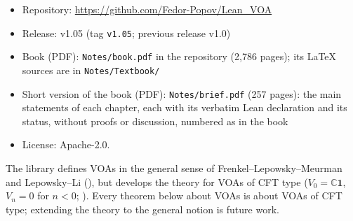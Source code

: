 \documentclass[10pt]{article}
\newcommand{\C}{\mathbb{C}}
\begin{document}
\begin{itemize}
  \item Repository: \url{https://github.com/Fedor-Popov/Lean_VOA}
  \item Release: v1.05 (tag \texttt{v1.05}; previous release v1.0)
  \item Book (PDF): \texttt{Notes/book.pdf} in the repository (2{,}786 pages); its \LaTeX{} sources are in
    \texttt{Notes/Textbook/}
  \item Short version of the book (PDF): \texttt{Notes/brief.pdf} (257 pages): the main statements of each chapter,
    each with its verbatim Lean declaration and its status, without proofs or discussion, numbered as in the book
  \item License: Apache-2.0.
\end{itemize}

The library defines VOAs in the general sense of Frenkel--Lepowsky--Meurman and Lepowsky--Li \cite{FLM,LepowskyLi}
(), but develops the theory for VOAs of CFT type ($V_0=\C\mathbf 1$, $V_n=0$ for
$n<0$; ). Every theorem below about VOAs is about VOAs of CFT type; extending the theory
to the general notion is future work.
\end{document}
